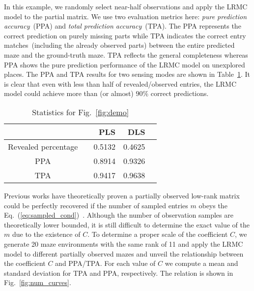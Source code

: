 In this example, we randomly select near-half observations and apply the LRMC model to the partial matrix. We use two evaluation metrics here: \textit{pure prediction accuracy}~(PPA) and \textit{total prediction accuracy}~(TPA). The PPA represents the correct prediction on purely missing parts while TPA indicates the correct entry matches~(including the already observed parts) between the entire predicted maze and the ground-truth maze. TPA reflects the general completeness whereas PPA shows the pure prediction performance of the LRMC model on unexplored places. 
The PPA and TPA results for two sensing modes are shown in Table~\ref{tb:exam_stat}. It is clear that even with less than half of revealed/observed entries, the LRMC model could achieve more than (or almost) $90\%$ correct predictions.



\begin{table}%
\caption{Statistics for Fig.~\ref{fig:demo}} %
\centering %
\begin{tabular}{c rrrr} %
\hline\hline %
  & \vline & PLS & DLS\\
\hline %
Revealed percentage & \vline & 0.5132 & 0.4625\\ %
PPA & \vline & 0.8914 & 0.9326\\ %
TPA & \vline & 0.9417 & 0.9638\\
\hline %
\end{tabular}
\label{tb:exam_stat}
\end{table}

Previous works have theoretically proven a partially observed low-rank matrix could be perfectly recovered if the number of sampled entries $m$ obeys the Eq.~(\ref{eq:sampled_cond})~\cite{candes2009exact}. Although the number of observation samples are theoretically lower bounded, it is still difficult to determine the exact value of the $m$ due to the existence of $C$. To determine a proper scale of the coefficient $C$, we generate 20 maze environments with the same rank of 11 and apply the LRMC model to different partially observed mazes and unveil the relationship between the coefficient $C$ and PPA/TPA. For each value of $C$ we compute a mean and standard deviation for TPA and PPA, respectively. The relation is shown in Fig.~\ref{fig:num_curves}.

